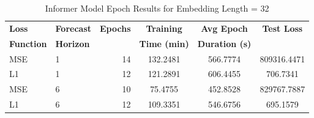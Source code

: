 \documentclass{article}
\begin{document}
\begin{table}[!htbp]
    \footnotesize
    \centering
    \caption{Informer Model Epoch Results for Embedding Length = 32}
    \begin{tabular}{l|l|r|S|S|S}
        \toprule
        \textbf{Loss} & \textbf{Forecast} & \textbf{Epochs} & \textbf{Training} & \textbf{Avg Epoch} & \textbf{Test Loss} \\
        \textbf{Function} & \textbf{Horizon} & & \textbf{Time (min)} & \textbf{Duration (s)} & \\
        \midrule
            MSE & 1 & 14 & 132.2481 & 566.7774 & 809316.4471 \\
        L1 & 1 & 12 & 121.2891 & 606.4455 & 706.7341 \\
        \midrule
        MSE & 6 & 10 & 75.4755 & 452.8528 & 829767.7887 \\
        L1 & 6 & 12 & 109.3351 & 546.6756 & 695.1579 \\
    \bottomrule
    \end{tabular}
    \label{tab:informer_epoch_emb32}
\end{table}
\end{document}
